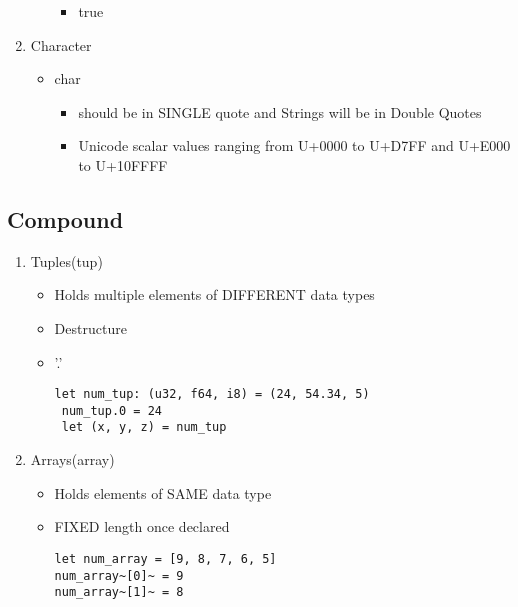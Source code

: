 \documentclass[11pt]{article}
\begin{document}
\begin{enumerate}
\begin{itemize}
\begin{itemize}
\item true
\end{itemize}
\end{itemize}

\item Character

\begin{itemize}
\item char

\begin{itemize}
\item should be in SINGLE quote and Strings will be in Double Quotes

\item Unicode scalar values ranging from U+0000 to U+D7FF  and U+E000 to U+10FFFF
\end{itemize}
\end{itemize}
\end{enumerate}


\subsection{Compound}
\label{sec-2-2}

\begin{enumerate}
\item Tuples(tup) 

\begin{itemize}
\item Holds multiple elements of DIFFERENT data types

\item Destructure

\item '.'

\begin{verbatim}
let num_tup: (u32, f64, i8) = (24, 54.34, 5)
 num_tup.0 = 24
 let (x, y, z) = num_tup
\end{verbatim}
\end{itemize}

\item Arrays(array) 

\begin{itemize}
\item Holds elements of SAME data type

\item FIXED length once declared

\begin{verbatim}
let num_array = [9, 8, 7, 6, 5]
num_array~[0]~ = 9
num_array~[1]~ = 8
\end{verbatim}
\end{itemize}
\end{enumerate}
\end{document}
